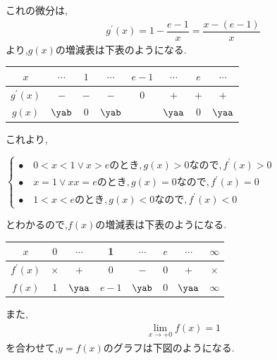\documentclass[dvipdfmx,10pt,fleqn,a4paper,twocolumn]{jsarticle}
\begin{document}
これの微分は,
\begin{align*}
  g^\prime(x)=1-\dfrac{e-1}{x}=\dfrac{x-(e-1)}{x}
\end{align*}
より,$g(x)$の増減表は下表のようになる.
\begin{center}
  \begin{tabular}{|c||c|c|c|c|c|c|c|}
    \hline
    $x$ & $\cdots$ & $1$ & $\cdots$ & $e-1$ & $\cdots$ & $e$ & $\cdots$\\
    \hline
    $g^\prime(x)$ & $-$ & $-$ & $-$ & $0$ & $+$ & $+$ & $+$\\
    \hline
    $g(x)$ & $\yab$ & $0$ & $\yab$ &{} & $\yaa$ & $0$ & $\yaa$\\
    \hline
  \end{tabular}
\end{center}
これより,
\begin{center}
$\begin{cases}
 \bullet\quad0<x<1\vee x>eのとき,g(x)>0なので,f^\prime(x)>0\\
 \bullet\quad x=1\vee xx=eのとき,g(x)=0なので,f^\prime(x)=0\\
 \bullet\quad1<x<e のとき,g(x)<0なので,f^\prime(x)<0 
\end{cases}$
\end{center}
とわかるので,$f(x)$の増減表は下表のようになる.
\begin{center}
  \begin{tabular}{|c||c|c|c|c|c|c|c|}
    \hline
    $x$ & $0$ &$\cdots$ & 1 & $\cdots$ & $e$ & $\cdots$ & $\infty$\\
    \hline
    $f^\prime(x)$ & $\times$ & $+$ & 0 & $-$ & 0 & $+$ &$\times$\\
    \hline
    $f(x)$ & 1 & $\yaa$ & $e-1$ &$\yab$ & 0 &$\yaa$ & $\infty$\\
    \hline
  \end{tabular}
\end{center}
また,
\begin{align*}
  \lim_{x\to+0}f(x)=1
\end{align*}
を合わせて,$y=f(x)$のグラフは下図のようになる.
\begin{center}
\end{center}
\end{document}
